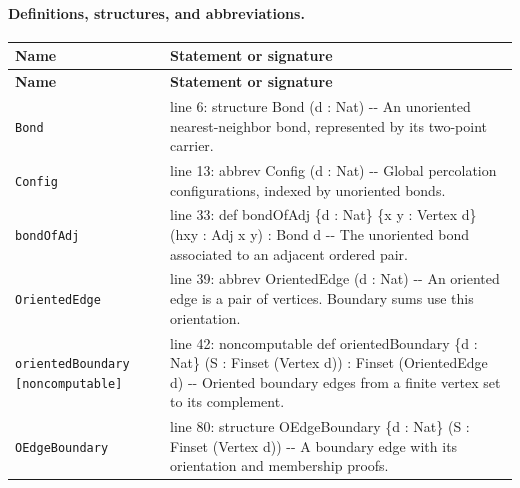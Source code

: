 \documentclass[10pt]{article}
\begin{document}
\paragraph{Definitions, structures, and abbreviations.}
\begin{longtable}{>{\raggedright\arraybackslash}p{} >{\raggedright\arraybackslash}p{}}
\textbf{Name} & \textbf{Statement or signature} \\
\hline
\endfirsthead
\textbf{Name} & \textbf{Statement or signature} \\
\hline
\endhead
\texttt{Bond} & {\ttfamily\scriptsize line 6:\allowbreak{} structure Bond (\allowbreak{}d :\allowbreak{} Nat)\allowbreak{} -\allowbreak{}-\allowbreak{} An unoriented nearest-\allowbreak{}neighbor bond,\allowbreak{} represented by its two-\allowbreak{}point carrier.\allowbreak{}} \\[0.45em]
\texttt{Config} & {\ttfamily\scriptsize line 13:\allowbreak{} abbrev Config (\allowbreak{}d :\allowbreak{} Nat)\allowbreak{} -\allowbreak{}-\allowbreak{} Global percolation configurations,\allowbreak{} indexed by unoriented bonds.\allowbreak{}} \\[0.45em]
\texttt{bondOfAdj} & {\ttfamily\scriptsize line 33:\allowbreak{} def bondOfAdj \{d :\allowbreak{} Nat\} \{x y :\allowbreak{} Vertex d\} (\allowbreak{}hxy :\allowbreak{} Adj x y)\allowbreak{} :\allowbreak{} Bond d -\allowbreak{}-\allowbreak{} The unoriented bond associated to an adjacent ordered pair.\allowbreak{}} \\[0.45em]
\texttt{OrientedEdge} & {\ttfamily\scriptsize line 39:\allowbreak{} abbrev OrientedEdge (\allowbreak{}d :\allowbreak{} Nat)\allowbreak{} -\allowbreak{}-\allowbreak{} An oriented edge is a pair of vertices.\allowbreak{} Boundary sums use this orientation.\allowbreak{}} \\[0.45em]
\texttt{orientedBoundary [noncomputable]} & {\ttfamily\scriptsize line 42:\allowbreak{} noncomputable def orientedBoundary \{d :\allowbreak{} Nat\} (\allowbreak{}S :\allowbreak{} Finset (\allowbreak{}Vertex d)\allowbreak{})\allowbreak{} :\allowbreak{} Finset (\allowbreak{}OrientedEdge d)\allowbreak{} -\allowbreak{}-\allowbreak{} Oriented boundary edges from a finite vertex set to its complement.\allowbreak{}} \\[0.45em]
\texttt{OEdgeBoundary} & {\ttfamily\scriptsize line 80:\allowbreak{} structure OEdgeBoundary \{d :\allowbreak{} Nat\} (\allowbreak{}S :\allowbreak{} Finset (\allowbreak{}Vertex d)\allowbreak{})\allowbreak{} -\allowbreak{}-\allowbreak{} A boundary edge with its orientation and membership proofs.\allowbreak{}} \\[0.45em]

\end{longtable}
\end{document}
